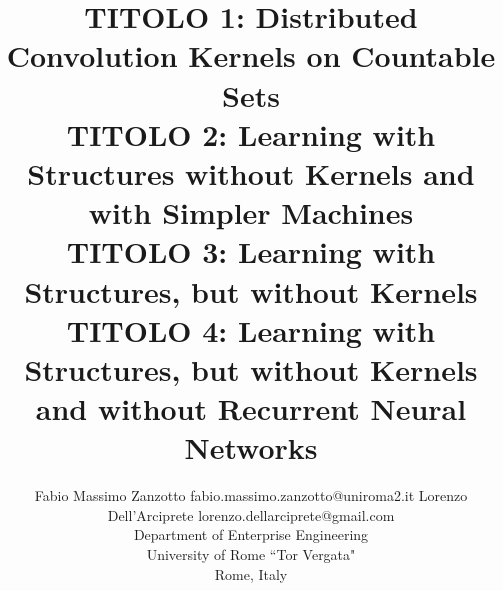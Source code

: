 \documentclass[twoside,11pt]{article}
\begin{document}
\title{TITOLO 1: Distributed Convolution Kernels on Countable Sets\\TITOLO 2: Learning with Structures without Kernels and with Simpler Machines\\TITOLO 3: Learning with Structures, but without Kernels\\TITOLO 4: Learning with Structures, but without Kernels and without Recurrent Neural Networks}

\author{\name Fabio Massimo Zanzotto \email fabio.massimo.zanzotto@uniroma2.it
\AND
\name Lorenzo Dell'Arciprete \email lorenzo.dellarciprete@gmail.com\\
       \addr Department of Enterprise Engineering\\
  	University of Rome ``Tor Vergata"\\
       Rome, Italy
      }


\maketitle
\end{document}
